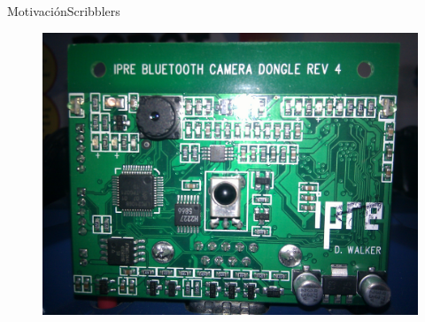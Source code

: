 \documentclass{beamer}
\begin{document}
\begin{frame}{Motivación}{Scribblers}
\begin{minipage}[t]{0.3\linewidth}
\begin{figure}
            \includegraphics[width=\linewidth]{images/fluke}
        \end{figure}
    \end{minipage}
\end{frame}
\end{document}
